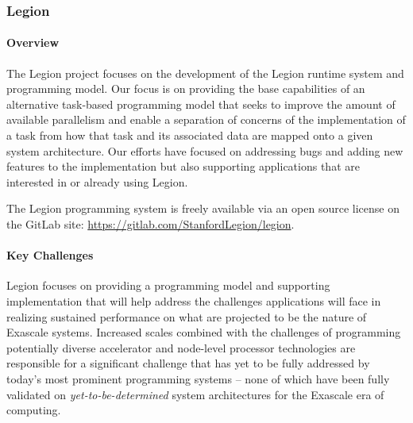 \subsubsection{Legion}

\paragraph{Overview}
The Legion project focuses on the development of the Legion runtime system and programming
model. Our focus is on providing the base capabilities of an alternative task-based 
programming model that seeks to improve the amount of available parallelism and enable a 
separation of concerns of the implementation of a task from how that task and its 
associated data are mapped onto a given system architecture.  Our efforts have focused on 
addressing bugs and adding new features to the implementation but also supporting 
applications that are interested in or already using Legion. 

The Legion programming system is freely available via an open source license on the GitLab
site: \url{https://gitlab.com/StanfordLegion/legion}.

\paragraph{Key Challenges}
Legion focuses on providing a programming model and supporting implementation that will 
help address the challenges applications will face in realizing sustained performance on
what are projected to be the nature of Exascale systems. Increased scales combined with 
the challenges of programming potentially diverse accelerator and node-level processor 
technologies are responsible for a significant challenge that has yet to be fully addressed
by today's most prominent programming systems -- none of which have been fully validated 
on \emph{yet-to-be-determined} system architectures for the Exascale era of computing. 

